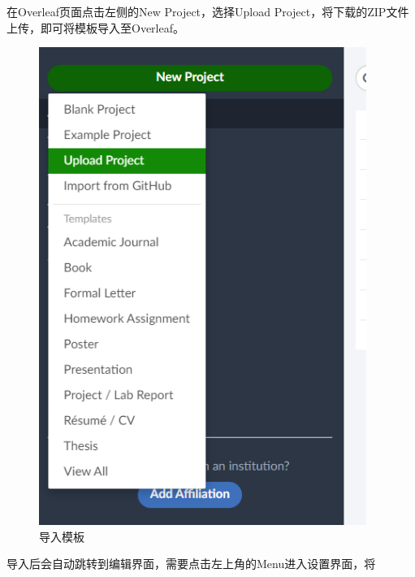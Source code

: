 在Overleaf页面点击左侧的New Project，选择Upload Project，将下载的ZIP文件上传，即可将模板导入至Overleaf。

\begin{figure}[htb]
    \centering
    \includegraphics[width=0.95\textwidth]{figures/chapter2/upload-project.png}
    \caption{导入模板}
    \label{fig:1-upload-project}
\end{figure}

导入后会自动跳转到编辑界面，需要点击左上角的Menu进入设置界面，将